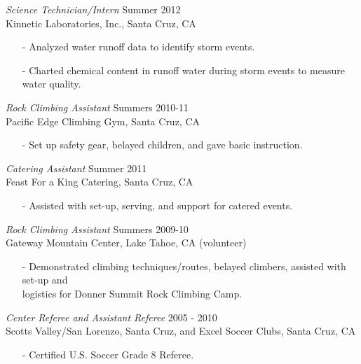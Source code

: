 \documentclass[margin]{res}
\begin{document}
\begin{resume}
\vspace{-6pt}
\textit{Science Technician/Intern } \hfill Summer 2012
\\Kinnetic Laboratories, Inc., Santa Cruz, CA 
\begin{itemize}
\item[-] Analyzed water runoff data to identify storm events.
\vspace{-3pt}\item[-] Charted chemical content in runoff water during storm events to measure water quality.
\end{itemize}

\vspace{-6pt}
\textit{Rock Climbing Assistant} \hfill Summers 2010-11
\\Pacific Edge Climbing Gym, Santa Cruz, CA 
\begin{itemize}
\item[-] Set up safety gear, belayed children, and gave basic instruction.
\end{itemize}

\vspace{-6pt}
\textit{Catering Assistant} \hfill Summer 2011
\\Feast For a King Catering, Santa Cruz, CA  	
\begin{itemize}
\item[-] Assisted with set-up, serving, and support for catered events.
\end{itemize}

\vspace{-6pt}
\textit{Rock Climbing Assistant} \hfill Summers 2009-10
\\Gateway Mountain Center, Lake Tahoe, CA (volunteer)
\begin{itemize}
\item[-] Demonstrated climbing techniques/routes, belayed climbers, assisted with set-up and \\logistics for Donner Summit Rock Climbing Camp.
\end{itemize}

\vspace{-6pt}
\textit{Center Referee and Assistant Referee } \hfill  2005 - 2010
\\Scotts Valley/San Lorenzo, Santa Cruz, and Excel Soccer Clubs, Santa Cruz, CA
\begin{itemize}
\item[-] Certified U.S. Soccer Grade 8 Referee.
\end{itemize}


\end{resume}
\end{document}
